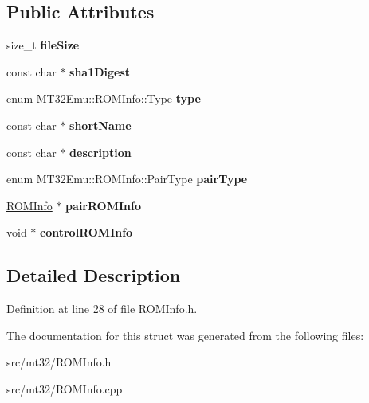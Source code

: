 \subsection*{Public Attributes}
\begin{DoxyCompactItemize}
\item 
\hypertarget{structMT32Emu_1_1ROMInfo_ae75b95115f90b2f076bddffc7ce5e6db}{size\-\_\-t {\bfseries file\-Size}}\label{structMT32Emu_1_1ROMInfo_ae75b95115f90b2f076bddffc7ce5e6db}

\item 
\hypertarget{structMT32Emu_1_1ROMInfo_a68a94f213d6a686aabf101697a210327}{const char $\ast$ {\bfseries sha1\-Digest}}\label{structMT32Emu_1_1ROMInfo_a68a94f213d6a686aabf101697a210327}

\item 
\hypertarget{structMT32Emu_1_1ROMInfo_aba1f53577e7e026633e92a841bd4780a}{enum M\-T32\-Emu\-::\-R\-O\-M\-Info\-::\-Type {\bfseries type}}\label{structMT32Emu_1_1ROMInfo_aba1f53577e7e026633e92a841bd4780a}

\item 
\hypertarget{structMT32Emu_1_1ROMInfo_a4543efb32ea76776590be4d5b128d6b8}{const char $\ast$ {\bfseries short\-Name}}\label{structMT32Emu_1_1ROMInfo_a4543efb32ea76776590be4d5b128d6b8}

\item 
\hypertarget{structMT32Emu_1_1ROMInfo_a5215fb42a51af2871973281b08b4df6c}{const char $\ast$ {\bfseries description}}\label{structMT32Emu_1_1ROMInfo_a5215fb42a51af2871973281b08b4df6c}

\item 
\hypertarget{structMT32Emu_1_1ROMInfo_a8429659d8862d7edb826def7ca49e435}{enum M\-T32\-Emu\-::\-R\-O\-M\-Info\-::\-Pair\-Type {\bfseries pair\-Type}}\label{structMT32Emu_1_1ROMInfo_a8429659d8862d7edb826def7ca49e435}

\item 
\hypertarget{structMT32Emu_1_1ROMInfo_aeba6031d67d40b7c941a8149a6b3cb34}{\hyperlink{structMT32Emu_1_1ROMInfo}{R\-O\-M\-Info} $\ast$ {\bfseries pair\-R\-O\-M\-Info}}\label{structMT32Emu_1_1ROMInfo_aeba6031d67d40b7c941a8149a6b3cb34}

\item 
\hypertarget{structMT32Emu_1_1ROMInfo_aa993647bfc5d5f82d9679adf5038ae61}{void $\ast$ {\bfseries control\-R\-O\-M\-Info}}\label{structMT32Emu_1_1ROMInfo_aa993647bfc5d5f82d9679adf5038ae61}

\end{DoxyCompactItemize}


\subsection{Detailed Description}


Definition at line 28 of file R\-O\-M\-Info.\-h.



The documentation for this struct was generated from the following files\-:\begin{DoxyCompactItemize}
\item 
src/mt32/R\-O\-M\-Info.\-h\item 
src/mt32/R\-O\-M\-Info.\-cpp\end{DoxyCompactItemize}
